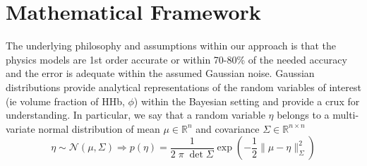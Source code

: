 \documentclass{article}         %
\theoremstyle{definition}
\theoremstyle{remark}
\begin{document}
\section{Mathematical Framework}\label{GeneralMathFramework}

The underlying philosophy and assumptions within our approach is that the physics 
models are 1st order accurate or within 70-80\% of the needed accuracy and the error is
adequate within the assumed Gaussian noise.
Gaussian distributions provide analytical representations of the random
variables of interest (ie volume fraction of HHb, $\phi$) within the Bayesian setting and 
provide a crux for understanding. In particular, we say that a random
variable $\eta$ belongs to a multi-variate normal distribution 
of mean $\mu \in \mathbb{R}^n $ and covariance $\Sigma \in \mathbb{R}^{n \times n}$
\[
     \eta \sim \mathcal{N}(\mu,\Sigma)  
    \Rightarrow
      p(\eta)  = \frac{1}{2 \; \pi \; \det{\Sigma}} \exp\left( - \frac{1}{2} \| \mu - \eta\|^2_{\Sigma}\right)
\]
\end{document}
